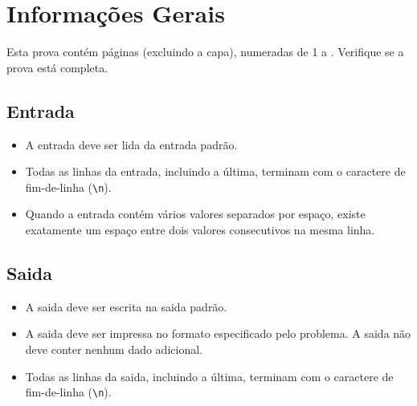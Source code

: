 \section*{Informações Gerais}

Esta prova contém \pageref*{lastpage} páginas (excluindo a capa), numeradas de 1 a \pageref*{lastpage}. Verifique se a prova está completa.

\subsection*{Entrada}

\begin{itemize}
   \item A entrada deve ser lida da entrada padrão.

	\item Todas as linhas da entrada, incluindo a última, terminam com o caractere de fim-de-linha (\texttt{\textbackslash n}).

	\item Quando a entrada contém vários valores separados por espaço, existe exatamente um espaço entre dois valores consecutivos na mesma linha.

\end{itemize}

\subsection*{Saida}

\begin{itemize}

    \item A saida deve ser escrita na saida padrão.

    \item A saida deve ser impressa no formato especificado pelo problema. A saida não deve conter nenhum dado adicional.

	\item Todas as linhas da saida, incluindo a última, terminam com o caractere de fim-de-linha (\texttt{\textbackslash n}).

\end{itemize}

